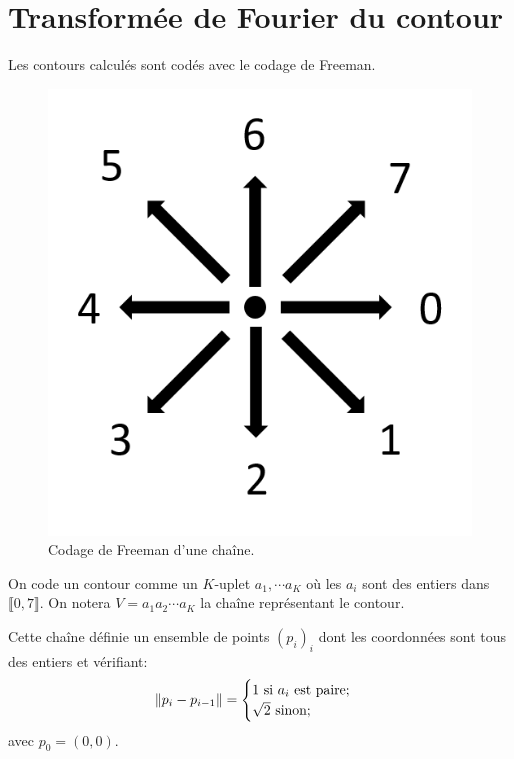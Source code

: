 
\chapter{Transformée de Fourier du contour}

Les contours calculés sont codés avec le codage de Freeman.

\begin{figure}[h!]
    \centering
    \includegraphics[scale=0.45]{assets/freeman-chain-encoding}
    \caption{Codage de Freeman d'une chaîne.}
	\label{fig:freeman-chain-encoding}
\end{figure}

On code un contour comme un $K$-uplet $a_1, \cdots a_K$ 
où les $a_i$ sont des entiers dans $\llbracket 0, 7 \rrbracket$. 
On notera $V = a_1 a_2 \cdots a_K$ la chaîne représentant le 
contour.

Cette chaîne définie un ensemble de points $(p_i)_i$ 
dont les coordonnées sont tous des entiers et vérifiant:
\[
\left\Vert p_i - p_{i-1}\right\Vert =
\begin{cases}
  1 \text{ si } a_i \text{ est paire;} \\
  \sqrt{2} \text{ sinon;} \\
\end{cases}
\]
avec $p_0 = (0,0)$.

